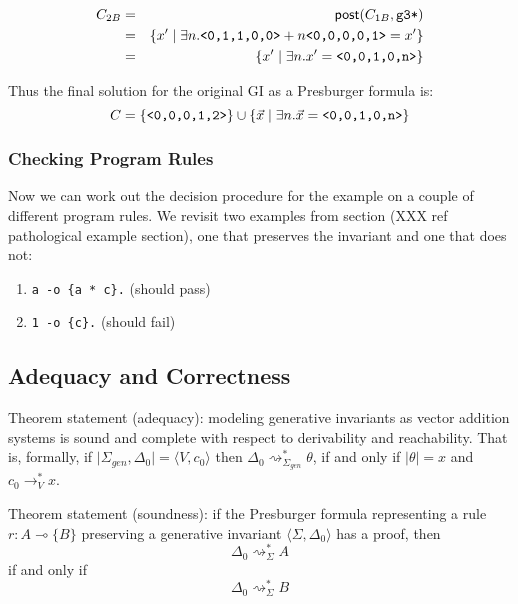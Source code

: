 \documentclass[fullpage, 11pt]{article}
\newcommand{\lolli}{\multimap}
\newcommand{\mon}[1]{\{#1\}}
\newcommand{\stepsto}{\rightsquigarrow}
\begin{document}
\begin{eqnarray*}
  C_{2B} &=& \mathsf{post}(C_{1B}, \verb|g3*|)\\
         &=& \{ 
              x' \mid
                \exists n. \verb|<0,1,1,0,0>| + n\verb|<0,0,0,0,1>| = x'
              \}\\
        &=& \{
              x' \mid
                \exists n. x' = \verb|<0,0,1,0,n>| \}
\end{eqnarray*}

Thus the final solution for the original GI as a Presburger formula is:
\[
C = \{ \verb|<0,0,0,1,2>| \} \cup
    \{\vec{x} \mid \exists n. \vec{x} = \verb|<0,0,1,0,n>|\}
\]


\subsubsection*{Checking Program Rules}

Now we can work out the decision procedure for the example on a couple of
different program rules. We revisit two examples from section (XXX ref
pathological example section), one that preserves the invariant and one
that does not:

\begin{enumerate}
\item \verb|a -o {a * c}.| (should pass)
\item \verb|1 -o {c}.| (should fail)
\end{enumerate}

\subsection{Adequacy and Correctness}

Theorem statement (adequacy): modeling generative invariants as vector
addition systems is sound and complete with respect to derivability and
reachability. That is, formally,
  if $\mid \Sigma_{gen}, \Delta_0 \mid = \langle V, c_0\rangle$
  then
  $\Delta_0 \stepsto^*_{\Sigma_{gen}} \theta$, 
  if and only if
  $\mid \theta \mid = x$ and $c_0 \to^*_{V} x$.


Theorem statement (soundness): if the Presburger formula representing a
rule $r : A \lolli \mon{B}$ 
preserving a generative invariant $\langle \Sigma, \Delta_0 \rangle$ 
has a proof, then 
\[
\Delta_0 \stepsto^*_{\Sigma} A 
\] 
if and only if 
\[
\Delta_0 \stepsto^*_{\Sigma} B 
\]
\end{document}

